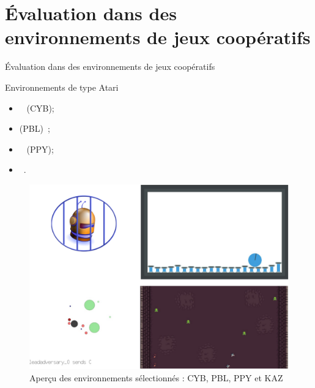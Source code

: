 

\section{Évaluation dans des environnements de jeux coopératifs}

\begin{frame}{Évaluation dans des environnements de jeux coopératifs}

    \begin{block}{Environnements de type Atari}

        \begin{minipage}{0.5\textwidth}
            \centering
            \begin{itemize}
                \item {}~\cite{cage_challenge_3_announcement} (CYB);
                \item {} (PBL)~\cite{Terry2021};
                \item {}~\cite{Lowe2017} (PPY);
                \item {}~\cite{Terry2021}.
            \end{itemize}
        \end{minipage}\hfill
        \begin{minipage}{0.5\textwidth}
            \centering
            \begin{figure}[H]
                \centering
                \includegraphics[width=0.5\linewidth]{figures/envs_4x4.png}
                \caption*{Aperçu des environnements sélectionnés : CYB, PBL, PPY et KAZ}
                \label{fig:simulated_environments}
            \end{figure}
        \end{minipage}\hfill


\end{block}
\end{frame}

